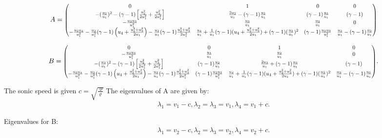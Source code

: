 \documentclass[11pt]{scrartcl}
\newcommand\scalemath[2]{\scalebox{#1}{\mbox{\ensuremath{\displaystyle #2}}}}
\begin{document}
\begin{align*}
	A=
	\scalemath{0.8}{
		\begin{pmatrix}
			0 & 1 & 0 & 0\\
			-(\frac{u_2}{u_1})^2- (\gamma -1) \left[\frac{u_2^2}{2 u_1^2}+\frac{u_3^2}{2 u_1^2}\right]    & \frac{2 u_2}{u_1} - (\gamma - 1)\frac{u_2}{u_1} &  (\gamma - 1) \frac{u_3}{u_1} & (\gamma - 1) \\
			-\frac{u_2 u_3}{u_1^2} & \frac{u_3}{u_1} & \frac{u_2}{u_1} & 0 \\
			-\frac{u_2 u_4}{u_1^2}-\frac{u_2}{u_1^2}(\gamma -1) \left(u_4+\frac{u_2^2+u_3^2}{2u_1}\right) - \frac{u_2}{u_1}(\gamma - 1) \frac{u_2^2+u_3^2}{2u_1^2} & 
			\frac{u_4}{u_1}+\frac{1}{u_1}(\gamma - 1) (u_4+ \frac{u_2^2+ u_3^2}{2 u_1}) + (\gamma - 1) (\frac{u_2}{u_1})^2
			& (\gamma - 1) \frac{u_2 u_3}{u_1^2} & \frac{u_2}{u_1} - (\gamma - 1) \frac{u_2}{u_1} 
	\end{pmatrix} }
\end{align*}

\begin{align*}
	B =
	\scalemath{0.8}{
		\begin{pmatrix}
			0 & 0 & 1 & 0\\
			-\frac{u_2 u_3}{u_1^2}  & \frac{u_3}{u_1} &   \frac{u_2}{u_1} & 0\\
			-(\frac{u_3}{u_1})^2- (\gamma -1) \left[\frac{u_2^2}{2 u_1^2}+\frac{u_3^2}{2 u_1^2}\right]  & (\gamma - 1 ) \frac{u_2}{u_1}& \frac{2 u_3}{u_1} + (\gamma - 1)\frac{u_3}{u_1} & ( \gamma - 1) \\
			-\frac{u_3  u_4}{u_1^2}-\frac{u_3}{u_1^2}(\gamma -1) \left(u_4+\frac{u_2^2+u_3^2}{2u_1}\right) - \frac{u_3}{u_1}(\gamma - 1) \frac{u_2^2+u_3^2}{2u_1^2} &  (\gamma - 1) \frac{u_2 u_3}{u_1^2}
			& \frac{u_4}{u_1}+\frac{1}{u_1}(\gamma - 1) (u_4+ \frac{u_2^2+ u_3^2}{2 u_1}) + (\gamma - 1) (\frac{u_3}{u_1})^2  & \frac{u_3}{u_1} - (\gamma - 1) \frac{u_3}{u_1} 
	\end{pmatrix} }.
\end{align*}

The sonic speed is given $c=\sqrt{\frac{\gamma p}{\varrho}}$
The eigenvalues of A are given by:
\begin{align*}
	\lambda_1=v_1 - c ,\lambda_2 = \lambda_3 = v_1 , \lambda_4 = v_1 + c.
\end{align*}

Eigenvalues for B:
\begin{align*}
	\lambda_1=v_2- c ,\lambda_2 = \lambda_3 = v_2 , \lambda_4 = v_2 + c.
\end{align*}
\end{document}
